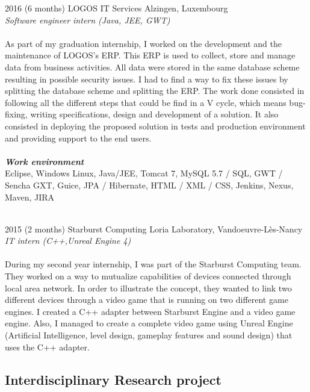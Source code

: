 \documentclass[]{friggeri-cv} %
\begin{document}
\begin{entrylist}

\entry 
{2016 (6 months)}
{LOGOS IT Services}
{Alzingen, Luxembourg}
{\\ \emph{Software engineer intern (Java, JEE, GWT)} \\ \\
As part of my graduation internship, I worked on the development and the maintenance of LOGOS's ERP. This ERP is used to collect, store and manage data from business activities. All data were stored in the same database scheme resulting in possible security issues. I had to find a way to fix these issues by splitting the database scheme and splitting the ERP. The work done consisted in following all the different steps that could be find in a V cycle, which means bug-fixing, writing specifications, design and development of a solution. It also consisted in deploying the proposed solution in tests and production environment and providing support to the end users.\\
\\ \textit{\textbf{Work environment }} \\ 
Eclipse, Windows Linux, Java/JEE, Tomcat 7, MySQL 5.7 / SQL, GWT / Sencha 
GXT, Guice, JPA / Hibernate, HTML / XML / CSS, Jenkins, Nexus, Maven, JIRA}

\entry
{\\2015 (2 months)}
{Starburst Computing}
{Loria Laboratory, Vandoeuvre-Lès-Nancy}
{\\ \emph{IT intern (C++,Unreal Engine 4)} \\ \\
During my second year internship, I was part of the Starburst Computing team. They worked on a way to mutualize capabilities of devices connected through local area network. In order to illustrate the concept, they wanted to link two different devices through a video game that is running on two different game engines. I created a C++ adapter between Starburst Engine and a video game engine. Also, I managed to create a complete video game using Unreal Engine (Artificial Intelligence, level design, gameplay features and sound design) that uses the C++ adapter.  
}


\end{entrylist}

\subsection{Interdisciplinary Research project}
\end{document}
